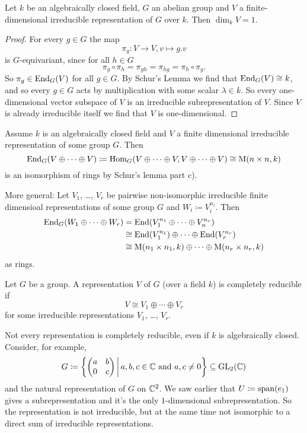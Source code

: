 \begin{cor}
 Let $k$ be an algebraically closed field, $G$ an abelian group and $V$ a finite-dimensional irreducible representation of $G$ over $k$. Then $\dim_k V = 1$.
\end{cor}
\begin{proof}
 For every $g \in G$ the map
 \[
  \pi_g \colon V \to V, v \mapsto g.v
 \]
 is $G$-equivariant, since for all $h \in G$
 \[
  \pi_g \circ \pi_h = \pi_{gh} = \pi_{hg} = \pi_h \circ \pi_g.
 \]
 So $\pi_g \in \operatorname{End}_G(V)$ for all $g \in G$. By Schur’s Lemma we find that $\operatorname{End}_G(V) \cong k$, and so every $g \in G$ acts by multiplication with some scalar $\lambda \in k$. So every one-dimensional vector subspace of $V$ is an irreducible subrepresentation of $V$. Since $V$ is already irreducible itself we find that $V$ is one-dimensional.
\end{proof}


\begin{rem}
 Assume $k$ is an algebraically closed field and $V$ a finite dimensional irreducible representation of some group $G$. Then
 \[
  \operatorname{End}_G(V \oplus \dotsb \oplus V)
  \coloneqq \operatorname{Hom}_G(V \oplus \dotsb \oplus V, V \oplus \dotsb \oplus V)
  \cong \operatorname{M}(n \times n, k)
 \]
 is an isomorphism of rings by Schur’s lemma part c).
 
 More general: Let $V_1$, \dots, $V_r$ be pairwise non-isomorphic irreducible finite dimensioal representations of some group $G$ and $W_i \coloneqq V_i^{n_i}$. Then
 \begin{align*}
  \operatorname{End}_G(W_1 \oplus \dotsb \oplus W_r)
  &= \operatorname{End}(V_1^{n_1} \oplus \dotsb \oplus V_n^{n_r}) \\
  &\cong \operatorname{End}(V_1^{n_1}) \oplus \dotsb \oplus \operatorname{End}(V_r^{n_r}) \\
  &\cong \operatorname{M}(n_1 \times n_1, k) \oplus \dotsb \oplus \operatorname{M}(n_r \times n_r, k)
 \end{align*}
 as rings.
\end{rem}


\begin{defi}
 Let $G$ be a group. A representation $V$ of $G$ (over a field $k$) is completely reducible if
 \[
  V \cong V_1 \oplus \dotsb \oplus V_r
 \]
 for some irreducible representations $V_1$, \dots, $V_r$.
\end{defi}


\begin{rem}
 Not every representation is completely reducible, even if $k$ is algebraically closed. Consider, for example,
 \[
  G \coloneqq \left\{\begin{pmatrix}a & b \\ 0 & c\end{pmatrix} \,\middle|\, a,b,c \in \mathbb{C} \text{ and } a,c \neq 0\right\}
  \subseteq \operatorname{GL}_2(\mathbb{C})
 \]
 and the natural representation of $G$ on $\mathbb{C}^2$. We saw earlier that $U \coloneqq \operatorname{span}(e_1)$ gives a subrepresentation and it’s the only $1$-dimensional subrepresentation. So the representation is not irreducible, but at the same time not isomorphic to a direct sum of irreducible representations.
\end{rem}


